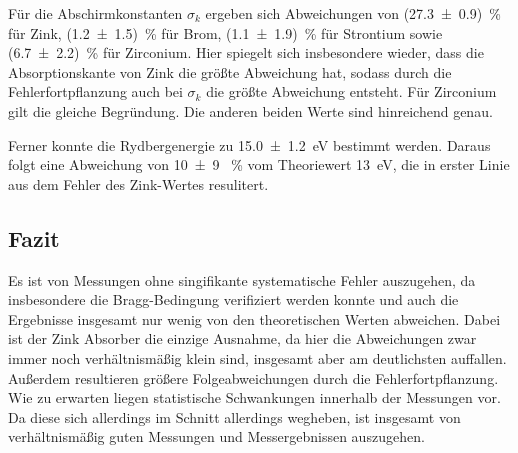 \noindent
Für die Abschirmkonstanten $\sigma_k$ ergeben sich Abweichungen von (\num[]{27.3 +- 0.9}) \,\% für Zink,
(\num[]{1.2 +- 1.5}) \,\% für Brom, (\num[]{1.1 +- 1.9}) \,\% für Strontium sowie (\num[]{6.7 +- 2.2}) \,\% für Zirconium.
Hier spiegelt sich insbesondere wieder, dass die Absorptionskante von Zink die größte Abweichung hat, sodass durch die Fehlerfortpflanzung auch bei $\sigma_k$
die größte Abweichung entsteht. 
Für Zirconium gilt die gleiche Begründung.
Die anderen beiden Werte sind hinreichend genau.

\noindent
Ferner konnte die Rydbergenergie zu \qty[]{15.0 +- 1.2}{\electronvolt} bestimmt werden.
Daraus folgt eine Abweichung von \num[]{10 +- 9} \, \% vom Theoriewert \qty[]{13}{\electronvolt},
die in erster Linie aus dem Fehler des Zink-Wertes resulitert.


\subsection{Fazit}%
Es ist von Messungen ohne singifikante systematische Fehler auszugehen, da insbesondere die Bragg-Bedingung verifiziert werden konnte
und auch die Ergebnisse insgesamt nur wenig von den theoretischen Werten abweichen.
Dabei ist der Zink Absorber die einzige Ausnahme, da hier die Abweichungen zwar immer noch verhältnismäßig klein sind, 
insgesamt aber am deutlichsten auffallen.
Außerdem resultieren größere Folgeabweichungen durch die Fehlerfortpflanzung.
Wie zu erwarten liegen statistische Schwankungen innerhalb der Messungen vor.
Da diese sich allerdings im Schnitt allerdings wegheben, ist insgesamt von verhältnismäßig guten Messungen und Messergebnissen auszugehen.
